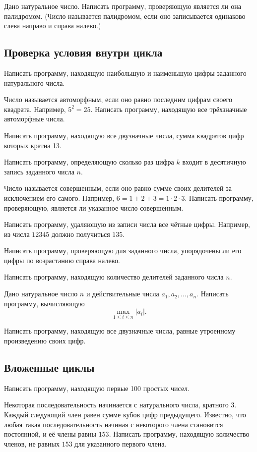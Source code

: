 \task Дано натуральное число. Написать программу, проверяющую является
ли она палидромом. (Число называется палидромом, если оно записывается
одинаково слева направо и справа налево.)

\subsection{Проверка условия внутри цикла}

\task Написать программу, находящую наибольшую и наименьшую цифры
заданного натурального числа.

\task Число называется автоморфным, если оно равно последним цифрам
своего квадрата. Например, $5^2=25$. Написать программу, находящую все
трёхзначные автоморфные числа.

\task Написать программу, находящую все двузначные числа, сумма
квадратов цифр которых кратна 13.

\task Написать программу, определяющую сколько раз цифра $k$ входит в
десятичную запись заданного числа $n$.

\task Число называется совершенным, если оно равно сумме своих
делителей за исключением его самого. Например, $6=1+2+3=1\cdot
2\cdot3$. Написать программу, проверяющую, является ли указанное число
совершенным.

\task Написать программу, удаляющую из записи числа все чётные
цифры. Например, из числа $12345$ должно получиться $135$.

\task Написать программу, проверяющую для заданного числа, упорядочены
ли его цифры по возрастанию справа налево.

\task Написать программу, находящую количество делителей заданного
числа $n$.

\task Дано натуральное число $n$ и действительные числа $a_1, a_2,
\ldots, a_n$. Написать программу, вычисляющую
\[
\max_{1\leqslant i\leqslant n} \left|a_i\right|.
\]

\task Написать программу, находящую все двузначные числа, равные
утроенному произведению своих цифр.

\subsection{Вложенные циклы}

\task Написать программу, находящую первые 100 простых чисел.

\task Некоторая последовательность начинается с натурального числа,
кратного 3. Каждый следующий член равен сумме кубов цифр
предыдущего. Известно, что любая такая последовательность начиная с
некоторого члена становится постоянной, и её члены равны
$153$. Написать программу, находящую количество членов, не равных $153$
для указанного первого члена.

